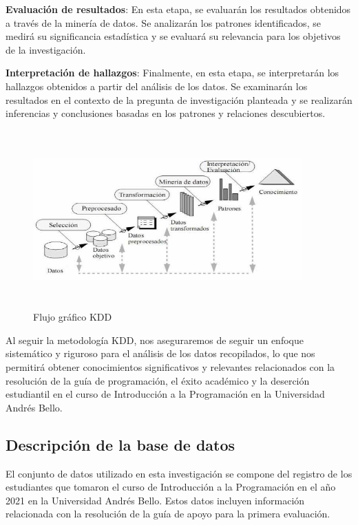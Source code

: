 \textbf{Evaluación de resultados}: En esta etapa, se evaluarán los resultados obtenidos a través de la minería de datos. Se analizarán los patrones identificados, se medirá su significancia estadística y se evaluará su relevancia para los objetivos de la investigación.

\textbf{Interpretación de hallazgos}: Finalmente, en esta etapa, se interpretarán los hallazgos obtenidos a partir del análisis de los datos. Se examinarán los resultados en el contexto de la pregunta de investigación planteada y se realizarán inferencias y conclusiones basadas en los patrones y relaciones descubiertos.

\begin{figure}[ht]
  \centering
  \includegraphics[width=4.06111in,height=2.68611in]{img/KDD.png}
  \caption{Flujo gráfico KDD}
  \label{fig:flujo_kdd}
\end{figure}

Al seguir la metodología KDD, nos aseguraremos de seguir un enfoque sistemático y riguroso para el análisis de los datos recopilados, lo que nos permitirá obtener conocimientos significativos y relevantes relacionados con la resolución de la guía de programación, el éxito académico y la deserción estudiantil en el curso de Introducción a la Programación en la Universidad Andrés Bello.


\subsection{Descripción de la base de datos}

El conjunto de datos utilizado en esta investigación se compone del registro de los estudiantes que tomaron el curso de
Introducción a la Programación en el año 2021 en la Universidad Andrés Bello. Estos datos incluyen información relacionada con la
resolución de la guía de apoyo para la primera evaluación.

